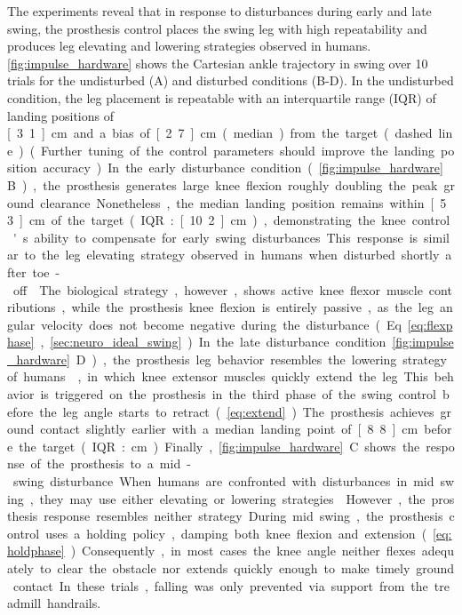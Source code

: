 The experiments reveal that in response to disturbances during early and late
swing, the prosthesis control places the swing leg with high repeatability and
produces leg elevating and lowering strategies observed in humans.
\cref{fig:impulse_hardware} shows the Cartesian ankle trajectory in swing over
10 trials for the undisturbed (A) and disturbed conditions (B-D). In the
undisturbed condition, the leg placement is repeatable with an interquartile
range (IQR) of landing positions of \unit[3.1]{cm} and a bias of \unit[2.7]{cm}
(median) from the target (dashed line).  (Further tuning of the control
parameters should improve the landing position accuracy.)

In the early disturbance condition (\cref{fig:impulse_hardware}B), the
prosthesis generates large knee flexion roughly doubling the peak ground
clearance. Nonetheless, the median landing position remains within
\unit[5.3]{cm} of the target (IQR: \unit[10.2]{cm}), demonstrating the knee
control's ability to compensate for early swing disturbances. This response is
similar to the leg elevating strategy observed in humans when disturbed shortly
after toe-off \citep{eng1994strategies, schillings2000muscular}. The biological
strategy, however, shows active knee flexor muscle contributions, while the
prosthesis knee flexion is entirely passive, as the leg angular velocity does
not become negative during the disturbance (Eq.~\ref{eq:flexphase},
\cref{sec:neuro_ideal_swing}).

In the late disturbance condition \cref{fig:impulse_hardware}D),
the prosthesis leg behavior resembles the lowering strategy of
humans~\citep{schillings2000muscular}, in which knee extensor muscles quickly
extend the leg. This behavior is triggered on the prosthesis in the third phase
of the swing control before the leg angle starts to retract
(\cref{eq:extend}). The prosthesis achieves ground contact slightly earlier
with a median landing point of \unit[8.8]{cm} before the target (IQR:
\unit[3]{cm}).

Finally, \cref{fig:impulse_hardware}C shows the response of the
prosthesis to a mid-swing disturbance. When humans are confronted with
disturbances in mid swing, they may use either elevating or lowering strategies
\citep{eng1994strategies, schillings2000muscular}. However, the prosthesis
response resembles neither strategy. During mid swing, the prosthesis control
uses a holding policy, damping both knee flexion and extension
(\cref{eq:holdphase}). Consequently, in most cases the knee angle neither
flexes adequately to clear the obstacle nor extends quickly enough to make
timely ground contact. In these trials, falling was only prevented via support
from the treadmill handrails.

